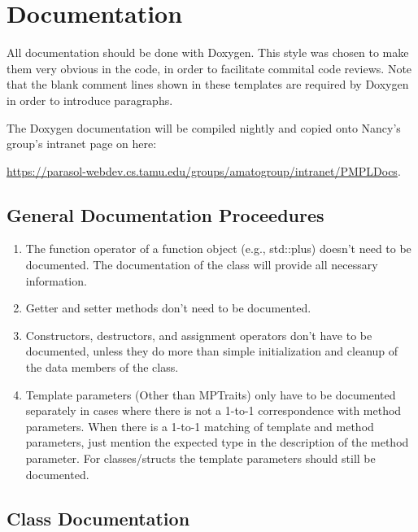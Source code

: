 \documentclass[12pt]{article}
\begin{document}



\section{Documentation}
All documentation should be done with Doxygen. This style was chosen to make
them very obvious in the code, in order to facilitate commital code reviews.
Note that the blank comment lines shown in these templates are required by
Doxygen in order to introduce paragraphs.

The Doxygen documentation will be compiled nightly and copied onto
Nancy's group's intranet page on here:

\url{https://parasol-webdev.cs.tamu.edu/groups/amatogroup/intranet/PMPLDocs}.

\subsection{General Documentation Proceedures}

\begin{enumerate}
  \item The function operator of a function object (e.g., std::plus) doesn’t
    need to be documented. The documentation of the class will provide all
    necessary information.
  \item Getter and setter methods don’t need to be documented.
  \item Constructors, destructors, and assignment operators don’t have to be
    documented, unless they do more than simple initialization and cleanup of
    the data members of the class.
  \item Template parameters (Other than MPTraits) only have to be documented
    separately in cases where there is not a 1-to-1 correspondence with method
    parameters. When there is a 1-to-1 matching of template and method
    parameters, just mention the expected type in the description of the method
    parameter. For classes/structs the template parameters should still be
    documented.
\end{enumerate}

\subsection{Class Documentation}
\end{document}
